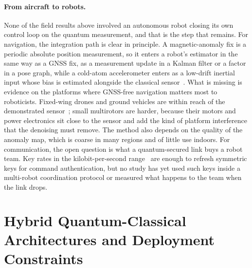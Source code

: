 \documentclass[acmsmall,screen,review]{acmart}
\begin{document}
\paragraph{From aircraft to robots.} None of the field results above involved an autonomous robot closing its own control loop on the quantum measurement, and that is the step that remains. For navigation, the integration path is clear in principle. A magnetic-anomaly fix is a periodic absolute position measurement, so it enters a robot's estimator in the same way as a GNSS fix, as a measurement update in a Kalman filter or a factor in a pose graph, while a cold-atom accelerometer enters as a low-drift inertial input whose bias is estimated alongside the classical sensor~\cite{Cheiney2018,Wang2021}. What is missing is evidence on the platforms where GNSS-free navigation matters most to roboticists. Fixed-wing drones and ground vehicles are within reach of the demonstrated sensor~\cite{Muradoglu2025}; small multirotors are harder, because their motors and power electronics sit close to the sensor and add the kind of platform interference that the denoising must remove. The method also depends on the quality of the anomaly map, which is coarse in many regions and of little use indoors. For communication, the open question is what a quantum-secured link buys a robot team. Key rates in the kilobit-per-second range~\cite{Tian2023,Conrad2025} are enough to refresh symmetric keys for command authentication, but no study has yet used such keys inside a multi-robot coordination protocol or measured what happens to the team when the link drops.


\section{Hybrid Quantum-Classical Architectures and Deployment Constraints}\label{sec:hybrid}
\end{document}
